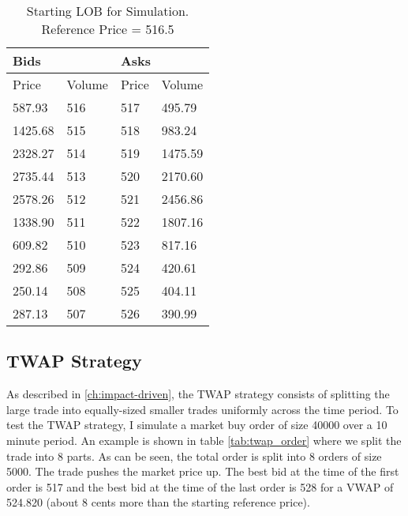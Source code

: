 \begin{table}[htbp]
\caption{Starting LOB for Simulation. Reference Price = 516.5} \label{tab:starting_LOB}
\begin{center}
\begin{tabular}{ll|ll}
\hline \hline
\multicolumn{2}{l|}{\textbf{Bids}} & \multicolumn{2}{l}{\textbf{Asks}} \\
\hline
Price        & Volume    & Price      & Volume      \\
587.93       & 516       & 517        & 495.79      \\
1425.68      & 515       & 518        & 983.24      \\
2328.27      & 514       & 519        & 1475.59     \\
2735.44      & 513       & 520        & 2170.60     \\
2578.26      & 512       & 521        & 2456.86     \\
1338.90      & 511       & 522        & 1807.16     \\
609.82       & 510       & 523        & 817.16      \\
292.86       & 509       & 524        & 420.61      \\
250.14       & 508       & 525        & 404.11      \\
287.13       & 507       & 526        & 390.99             
\end{tabular}
\end{center}
\end{table}

\subsection{TWAP Strategy}
As described in \ref{ch:impact-driven}, the TWAP strategy consists of splitting the large trade into equally-sized smaller trades uniformly across the time period. To test the TWAP strategy, I simulate a market buy order of size 40000 over a 10 minute period. An example is shown in table \ref{tab:twap_order} where we split the trade into 8 parts. As can be seen, the total order is split into 8 orders of size 5000. The trade pushes the market price up. The best bid at the time of the first order is 517 and the best bid at the time of the last order is 528 for a VWAP of 524.820 (about 8 cents more than the starting reference price).

